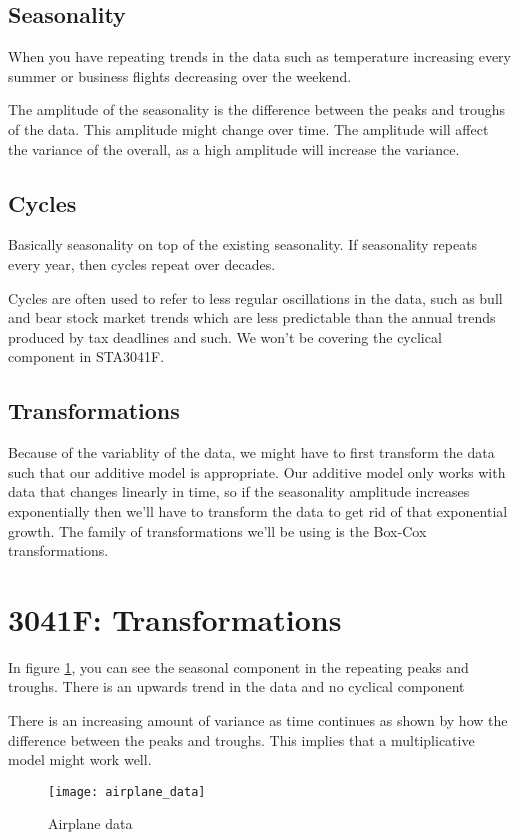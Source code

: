     \subsection{Seasonality}
    When you have repeating trends in the data such as temperature increasing every summer or business flights decreasing over the weekend.

    The amplitude of the seasonality is the difference between the peaks and troughs of the data.
    This amplitude might change over time. The amplitude will affect the variance of the overall, as a high amplitude will increase the variance.

    \subsection{Cycles}
    Basically seasonality on top of the existing seasonality. If seasonality repeats every year, then cycles repeat over decades. 

    Cycles are often used to refer to less regular oscillations in the data, such as bull and bear stock market trends which are less predictable than the annual trends produced by tax deadlines and such.
    We won't be covering the cyclical component in STA3041F.

    \subsection{Transformations}
    Because of the variablity of the data, we might have to first transform the data such that our additive model is appropriate.
    Our additive model only works with data that changes linearly in time, so if the seasonality amplitude increases exponentially then we'll have to transform the data to get rid of that exponential growth.
    The family of transformations we'll be using is the Box-Cox transformations.

    \section{3041F: Transformations}
    In figure \ref{fig:airplane_data}, you can see the seasonal component in the repeating peaks and troughs. 
    There is an upwards trend in the data and no cyclical component

    There is an increasing amount of variance as time continues as shown by how the difference between the peaks and troughs. This implies that a multiplicative model might work well.
    \begin{figure}[t]
        \centering
        \texttt{[image: airplane\_data]}
        \caption{Airplane data}
        \label{fig:airplane_data}
    \end{figure}

